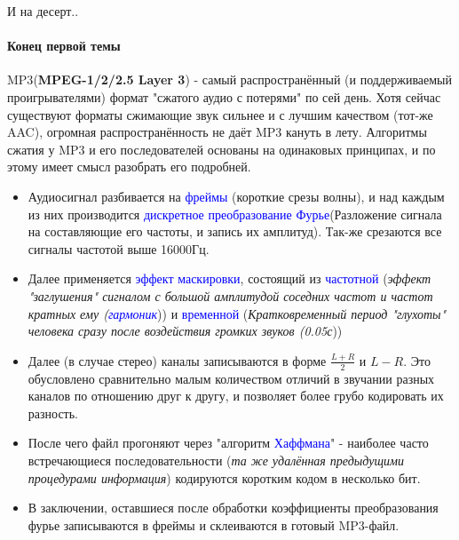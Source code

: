 \documentclass[aspectratio=169]{beamer}
\newcommand{\blu}{\textcolor{blue}}
\newcommand{\zag}{\huge\alert}
\newcommand{\n}{\normalsize}
\begin{document}
\begin{frame}[shrink=28]{И на десерт..}
\framesubtitle{Конец первой темы}
     \zag{MP3}\n (\textbf{MPEG-1/2/2.5 Layer 3}) - самый распространённый (и поддерживаемый проигрывателями) формат "сжатого аудио с потерями" по сей день. Хотя сейчас существуют форматы сжимающие звук сильнее и с лучшим качеством (тот-же \alert{AAC}), огромная распространённость не даёт \alert{MP3} кануть в лету. Алгоритмы сжатия у \alert{MP3} и его последователей основаны на одинаковых принципах, и по этому имеет смысл разобрать его подробней.
     \begin{itemize}
         \item Аудиосигнал разбивается на \blu{фреймы} (короткие срезы волны), и над каждым из них производится \blu{дискретное преобразование Фурье}(Разложение сигнала на составляющие его частоты, и запись их амплитуд). Так-же срезаются все сигналы частотой выше 16000Гц.
         
         \item Далее применяется \blu{эффект маскировки}, состоящий из \blu{частотной} (\textit{эффект "заглушения" сигналом с большой амплитудой соседних частот и частот кратных ему (\blu{гармоник}})) и \blu{временной} (\textit{Кратковременный период "глухоты" человека сразу после воздействия громких звуков (\approx 0.05с}))
         
         \item Далее (в случае стерео) каналы записываются в форме $\frac{L+R}{2}$ и $L-R$. Это обусловлено сравнительно малым количеством отличий в звучании разных каналов по отношению друг к другу, и позволяет более грубо кодировать их разность.
         
         \item После чего файл прогоняют через "алгоритм \blu{Хаффмана}" - наиболее часто встречающиеся последовательности (\textit{та же удалённая предыдущими процедурами информация}) кодируются коротким кодом в несколько бит.
         
         \item В заключении, оставшиеся после обработки коэффициенты преобразования фурье записываются в фреймы и склеиваются в готовый \alert{MP3}-файл.
     \end{itemize}
\end{frame}
\end{document}
